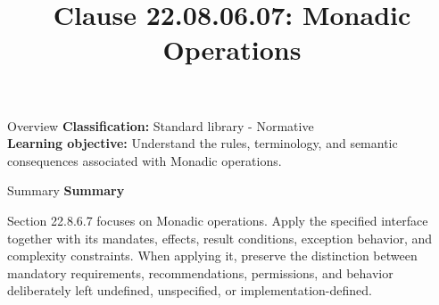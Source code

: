 \documentclass[10pt,letterpaper]{article}
\title{Clause 22.08.06.07: Monadic Operations}
\author{}
\date{}
\begin{document}
\maketitle
\begin{CornellOverviewBox}{Overview}
\textbf{Classification:} Standard library - Normative\\[2pt]
\textbf{Learning objective:} Understand the rules, terminology, and semantic consequences associated with Monadic operations.
\end{CornellOverviewBox}\begin{CornellSummaryBox}{Summary}
{\sffamily\bfseries\color{Accent} Summary}\par\vspace{3pt}Section 22.8.6.7 focuses on Monadic operations. Apply the specified interface together with its mandates, effects, result conditions, exception behavior, and complexity constraints. When applying it, preserve the distinction between mandatory requirements, recommendations, permissions, and behavior deliberately left undefined, unspecified, or implementation-defined.
\end{CornellSummaryBox}
\end{document}
